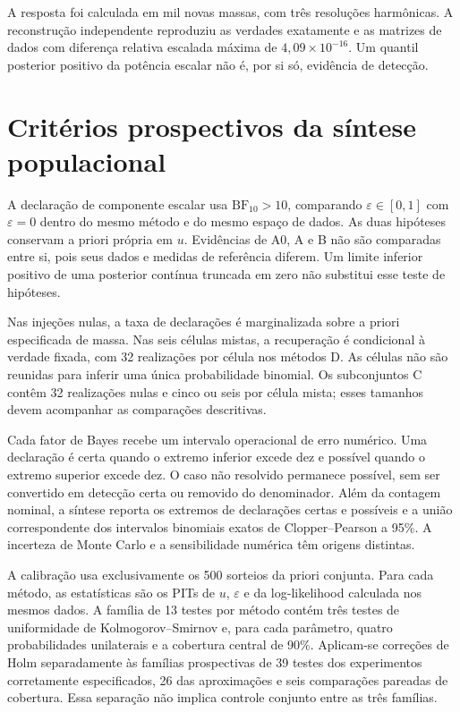 A resposta foi calculada em mil novas massas, com três resoluções harmônicas. A reconstrução independente reproduziu as verdades exatamente e as matrizes de dados com diferença relativa escalada máxima de $4{,}09\times10^{-16}$. Um quantil posterior positivo da potência escalar não é, por si só, evidência de detecção.

\section{Critérios prospectivos da síntese populacional}

A declaração de componente escalar usa $\mathrm{BF}_{10}>10$, comparando
$\varepsilon\in[0,1]$ com $\varepsilon=0$ dentro do mesmo método e do mesmo
espaço de dados. As duas hipóteses conservam a priori própria em $u$.
Evidências de A0, A e B não são comparadas entre si, pois seus dados e
medidas de referência diferem. Um limite inferior positivo de uma posterior
contínua truncada em zero não substitui esse teste de hipóteses.

Nas injeções nulas, a taxa de declarações é marginalizada sobre a priori
especificada de massa. Nas seis células mistas, a recuperação é condicional
à verdade fixada, com 32 realizações por célula nos métodos D. As células
não são reunidas para inferir uma única probabilidade binomial. Os
subconjuntos C contêm 32 realizações nulas e cinco ou seis por célula mista;
esses tamanhos devem acompanhar as comparações descritivas.

Cada fator de Bayes recebe um intervalo operacional de erro numérico.
Uma declaração é certa quando o extremo inferior excede dez e possível
quando o extremo superior excede dez. O caso não resolvido permanece
possível, sem ser convertido em detecção certa ou removido do denominador.
Além da contagem nominal, a síntese reporta os extremos de declarações
certas e possíveis e a união correspondente dos intervalos binomiais
exatos de Clopper--Pearson a 95\%. A incerteza de Monte Carlo e a
sensibilidade numérica têm origens distintas.

A calibração usa exclusivamente os 500 sorteios da priori conjunta.
Para cada método, as estatísticas são os PITs de $u$, $\varepsilon$ e da
log-likelihood calculada nos mesmos dados. A família de 13 testes por
método contém três testes de uniformidade de Kolmogorov--Smirnov e, para
cada parâmetro, quatro probabilidades unilaterais e a cobertura central
de 90\%. Aplicam-se correções de Holm separadamente às famílias
prospectivas de 39 testes dos experimentos corretamente especificados,
26 das aproximações e seis comparações pareadas de cobertura.
Essa separação não implica controle conjunto entre as três famílias.

